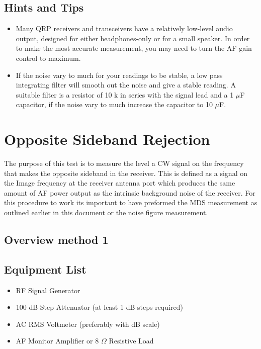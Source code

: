 \documentclass[10pt,letterpaper]{book}
\begin{document}
\subsection*{Hints and Tips}
\begin{itemize}
	\item Many QRP receivers and transceivers have a relatively low-level audio output, designed for either headphones-only or for a small speaker. In order to make the most accurate measurement, you may need to turn the AF gain control to maximum.
	\item If the noise vary to much for your readings to be stable, a low pass integrating filter will smooth out the noise and give a stable reading. A suitable filter is a resistor of 10 k in series with the signal lead and a 1 $\mu$F capacitor, if the noise vary to much increase the capacitor to 10 $\mu$F.  
	
\end{itemize}
\newpage

\section{Opposite Sideband Rejection}
The purpose of this test is to measure the level a CW signal on the frequency that makes the opposite sideband in the receiver.
This is defined as a signal on the Image frequency at the receiver antenna port which produces the same amount of AF power output as the intrinsic background noise of the receiver.  For this procedure to work its important to have preformed the MDS measurement as outlined earlier in this document or the noise figure measurement.
\subsection*{Overview method 1}
\subsection*{Equipment List}
\begin{itemize}
	\item RF Signal Generator
	\item 100 dB Step Attenuator (at least 1 dB steps required)
	\item AC RMS Voltmeter (preferably with dB scale)
	\item AF Monitor Amplifier or 8 $\Omega$ Resistive Load
\end{itemize}
\end{document}
